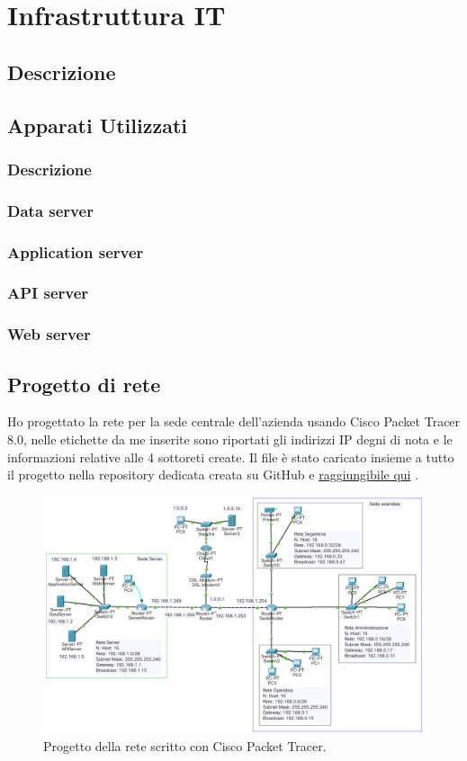 \section{Infrastruttura IT}
\subsection{Descrizione}
\subsection{Apparati Utilizzati}
\subsubsection{Descrizione}
\subsubsection{Data server}
\subsubsection{Application server}
\subsubsection{API server}
\subsubsection{Web server}
\subsection{Progetto di rete} 
Ho progettato la rete per la sede centrale dell'azienda usando Cisco Packet Tracer 8.0, nelle etichette da me inserite sono riportati gli indirizzi IP degni di nota e le informazioni relative alle 4 sottoreti create. Il file è stato caricato insieme a tutto il progetto nella repository dedicata creata su GitHub e \href{https://github.com/MauroPello/elaborato}{raggiungibile qui} \cite{GitHub}. 
\begin{figure}
    \centering\includegraphics[scale=.48]{images/rete.png}
    \caption{Progetto della rete scritto con Cisco Packet Tracer. }
\end{figure}
\clearpage